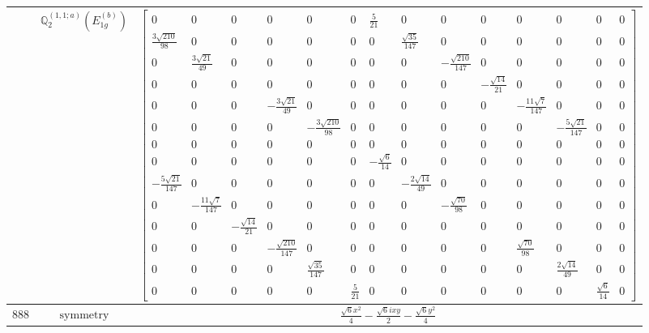 \documentclass[fleqn,8pt,landscape]{jsarticle}
\begin{document}
\begin{longtable}{ccc}
$  $ & $ \mathbb{Q}_{2}^{(1,1;a)}(E_{1g}^{(b)}) $ & $ \begin{bmatrix} 0 & 0 & 0 & 0 & 0 & 0 & \frac{5}{21} & 0 & 0 & 0 & 0 & 0 & 0 & 0 \\ \frac{3 \sqrt{210}}{98} & 0 & 0 & 0 & 0 & 0 & 0 & \frac{\sqrt{35}}{147} & 0 & 0 & 0 & 0 & 0 & 0 \\ 0 & \frac{3 \sqrt{21}}{49} & 0 & 0 & 0 & 0 & 0 & 0 & - \frac{\sqrt{210}}{147} & 0 & 0 & 0 & 0 & 0 \\ 0 & 0 & 0 & 0 & 0 & 0 & 0 & 0 & 0 & - \frac{\sqrt{14}}{21} & 0 & 0 & 0 & 0 \\ 0 & 0 & 0 & - \frac{3 \sqrt{21}}{49} & 0 & 0 & 0 & 0 & 0 & 0 & - \frac{11 \sqrt{7}}{147} & 0 & 0 & 0 \\ 0 & 0 & 0 & 0 & - \frac{3 \sqrt{210}}{98} & 0 & 0 & 0 & 0 & 0 & 0 & - \frac{5 \sqrt{21}}{147} & 0 & 0 \\ 0 & 0 & 0 & 0 & 0 & 0 & 0 & 0 & 0 & 0 & 0 & 0 & 0 & 0 \\ 0 & 0 & 0 & 0 & 0 & 0 & - \frac{\sqrt{6}}{14} & 0 & 0 & 0 & 0 & 0 & 0 & 0 \\ - \frac{5 \sqrt{21}}{147} & 0 & 0 & 0 & 0 & 0 & 0 & - \frac{2 \sqrt{14}}{49} & 0 & 0 & 0 & 0 & 0 & 0 \\ 0 & - \frac{11 \sqrt{7}}{147} & 0 & 0 & 0 & 0 & 0 & 0 & - \frac{\sqrt{70}}{98} & 0 & 0 & 0 & 0 & 0 \\ 0 & 0 & - \frac{\sqrt{14}}{21} & 0 & 0 & 0 & 0 & 0 & 0 & 0 & 0 & 0 & 0 & 0 \\ 0 & 0 & 0 & - \frac{\sqrt{210}}{147} & 0 & 0 & 0 & 0 & 0 & 0 & \frac{\sqrt{70}}{98} & 0 & 0 & 0 \\ 0 & 0 & 0 & 0 & \frac{\sqrt{35}}{147} & 0 & 0 & 0 & 0 & 0 & 0 & \frac{2 \sqrt{14}}{49} & 0 & 0 \\ 0 & 0 & 0 & 0 & 0 & \frac{5}{21} & 0 & 0 & 0 & 0 & 0 & 0 & \frac{\sqrt{6}}{14} & 0 \end{bmatrix} $ \\ \hline
$ 888 $ & $ \text{symmetry} $ & $ \frac{\sqrt{6} x^{2}}{4} - \frac{\sqrt{6} i x y}{2} - \frac{\sqrt{6} y^{2}}{4} $ \\

\end{longtable}
\end{document}
